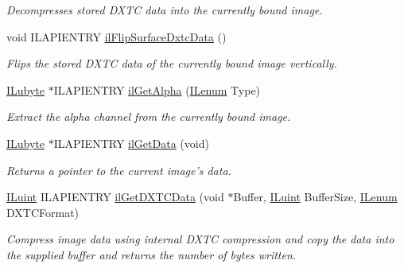 \begin{DoxyCompactItemize}
\begin{DoxyCompactList}\small\item\em Decompresses stored D\+X\+T\+C data into the currently bound image. \end{DoxyCompactList}\item 
\hypertarget{group__data_ga275bf97933de4ca996bcceeee3a58621}{void I\+L\+A\+P\+I\+E\+N\+T\+R\+Y \hyperlink{group__data_ga275bf97933de4ca996bcceeee3a58621}{il\+Flip\+Surface\+Dxtc\+Data} ()}\label{group__data_ga275bf97933de4ca996bcceeee3a58621}

\begin{DoxyCompactList}\small\item\em Flips the stored D\+X\+T\+C data of the currently bound image vertically. \end{DoxyCompactList}\item 
\hyperlink{group__il__types_ga057357939bc5a12e8061715453568519}{I\+Lubyte} $\ast$I\+L\+A\+P\+I\+E\+N\+T\+R\+Y \hyperlink{group__data_gaaf70fd0dbf35dd1e31700543c6e763d4}{il\+Get\+Alpha} (\hyperlink{group__il__types_ga62ca73445716183ef42b1f3906a45ed0}{I\+Lenum} Type)
\begin{DoxyCompactList}\small\item\em Extract the alpha channel from the currently bound image. \end{DoxyCompactList}\item 
\hyperlink{group__il__types_ga057357939bc5a12e8061715453568519}{I\+Lubyte} $\ast$I\+L\+A\+P\+I\+E\+N\+T\+R\+Y \hyperlink{group__data_ga7935a3b79dcdc71ee0f682854939dcc9}{il\+Get\+Data} (void)
\begin{DoxyCompactList}\small\item\em Returns a pointer to the current image's data. \end{DoxyCompactList}\item 
\hyperlink{group__il__types_gaff8e86a1072c8d7cfe387fb87c6ed8e1}{I\+Luint} I\+L\+A\+P\+I\+E\+N\+T\+R\+Y \hyperlink{group__data_ga4ae3b92dd5e43a62dd44b3ee9d85087f}{il\+Get\+D\+X\+T\+C\+Data} (void $\ast$Buffer, \hyperlink{group__il__types_gaff8e86a1072c8d7cfe387fb87c6ed8e1}{I\+Luint} Buffer\+Size, \hyperlink{group__il__types_ga62ca73445716183ef42b1f3906a45ed0}{I\+Lenum} D\+X\+T\+C\+Format)
\begin{DoxyCompactList}\small\item\em Compress image data using internal D\+X\+T\+C compression and copy the data into the supplied buffer and returns the number of bytes written. \end{DoxyCompactList}\item 

\end{DoxyCompactItemize}
